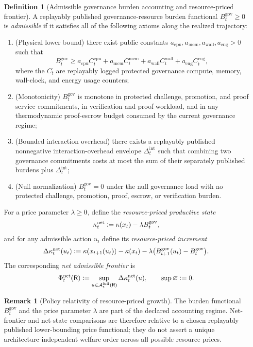\documentclass[11pt]{article}
\theoremstyle{definition}
\newtheorem{definition}[theorem]{Definition}
\newtheorem{remark}[theorem]{Remark}
\newcommand{\1}{\mathbf{1}}
\newcommand{\Defeq}{\vcentcolon=}
\begin{document}
\begin{definition}[Admissible governance burden accounting and resource-priced frontier]\label{def:net_growth_metric}
A replayably published governance-resource burden functional $B_t^{\mathrm{gov}}\ge 0$ is \emph{admissible} if it satisfies all of the following axioms along the realized trajectory:
\begin{enumerate}[label=(\roman*), leftmargin=2em]
  \item (Physical lower bound) there exist public constants $a_{\mathrm{cpu}},a_{\mathrm{mem}},a_{\mathrm{wall}},a_{\mathrm{eng}}>0$ such that
  \[
  B_t^{\mathrm{gov}}\ge a_{\mathrm{cpu}}C_t^{\mathrm{cpu}}+a_{\mathrm{mem}}C_t^{\mathrm{mem}}+a_{\mathrm{wall}}C_t^{\mathrm{wall}}+a_{\mathrm{eng}}C_t^{\mathrm{eng}},
  \]
  where the $C_t^{\cdot}$ are replayably logged protected governance compute, memory, wall-clock, and energy usage counters;
  \item (Monotonicity) $B_t^{\mathrm{gov}}$ is monotone in protected challenge, promotion, and proof service commitments, in verification and proof workload, and in any thermodynamic proof-escrow budget consumed by the current governance regime;
  \item (Bounded interaction overhead) there exists a replayably published nonnegative interaction-overhead envelope $\Delta_t^{\mathrm{int}}$ such that combining two governance commitments costs at most the sum of their separately published burdens plus $\Delta_t^{\mathrm{int}}$;
  \item (Null normalization) $B_t^{\mathrm{gov}}=0$ under the null governance load with no protected challenge, promotion, proof, escrow, or verification burden.
\end{enumerate}
For a price parameter $\lambda\ge 0$, define the \emph{resource-priced productive state}
\[
\kappa_t^{\mathrm{net}}\Defeq \kappa(x_t)-\lambda B_t^{\mathrm{gov}},
\]
and for any admissible action $u_t$ define its \emph{resource-priced increment}
\[
\Delta\kappa_t^{\mathrm{net}}(u_t)\Defeq \kappa(x_{t+1}(u_t)) - \kappa(x_t) - \lambda\bigl(B_{t+1}^{\mathrm{gov}}(u_t)-B_t^{\mathrm{gov}}\bigr).
\]
The corresponding \emph{net admissible frontier} is
\[
\Phi_t^{\mathrm{net}}(\mathsf R)\Defeq \sup_{u\in\mathcal A_t^{\mathrm{full}}(\mathsf R)} \Delta\kappa_t^{\mathrm{net}}(u),
\qquad \sup\varnothing\Defeq 0.
\]
\end{definition}

\begin{remark}[Policy relativity of resource-priced growth]
The burden functional $B_t^{\mathrm{gov}}$ and the price parameter $\lambda$ are part of the declared accounting regime. Net-frontier and net-state comparisons are therefore relative to a chosen replayably published lower-bounding price functional; they do not assert a unique architecture-independent welfare order across all possible resource prices.
\end{remark}
\end{document}

